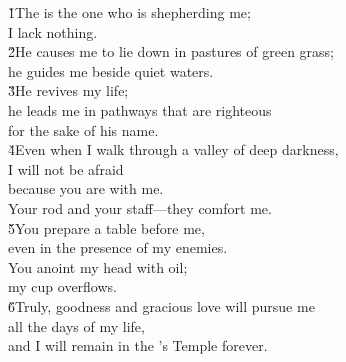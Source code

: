 \begin{poetry}
\poeml \v{1}The  is the one who is shepherding me; \\
\poemll    I lack nothing. \\
\poeml \v{2}He causes me to lie down in pastures of green grass; \\
\poemll    he guides me beside quiet waters. \\
\poeml \v{3}He revives my life; \\
\poemll    he leads me in pathways that are righteous \\
\poemlll       for the sake of his name. \\
\poeml \v{4}Even when I walk through a valley of deep darkness, \\
\poemll    I will not be afraid \\
\poemlll       because you are with me. \\
\poeml Your rod and your staff---they comfort me. \\
\poeml \v{5}You prepare a table before me, \\
\poemll    even in the presence of my enemies. \\
\poeml You anoint my head with oil; \\
\poemll    my cup overflows. \\
\poeml \v{6}Truly, goodness and gracious love will pursue me \\
\poemll    all the days of my life, \\
\poemlll       and I will remain in the 's Temple forever.
\end{poetry}

